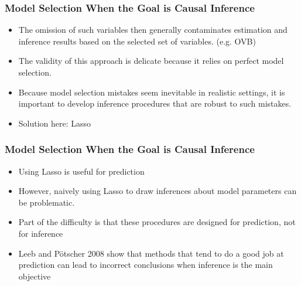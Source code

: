\documentclass[
  shownotes,
  xcolor={svgnames},
  hyperref={colorlinks,citecolor=DarkBlue,linkcolor=DarkRed,urlcolor=DarkBlue}
  , aspectratio=169]{beamer}
\begin{document}
\begin{frame}[fragile]
\frametitle{Model Selection When the Goal is Causal Inference}


\begin{itemize}
  \item The omission of such variables then generally contaminates estimation and inference results based on the selected set of variables. (e.g. OVB)
  \medskip
  \item The validity of this approach is delicate because it relies on perfect model selection.
  \medskip
  \item Because model selection mistakes seem inevitable in realistic settings, it is important to develop inference procedures that are robust to such mistakes.
  \medskip
  \item Solution here: Lasso
\end{itemize}


\end{frame}
\begin{frame}[fragile]
\frametitle{Model Selection When the Goal is Causal Inference}
\begin{itemize}
\item Using Lasso is useful for prediction
\medskip
\item However, naively using Lasso  to draw inferences about model parameters can be problematic.
\medskip
\item Part of the difficulty is that these procedures are designed for prediction, not for inference  
\medskip
\item Leeb and Pötscher 2008 show that methods that tend to do a good job at prediction can lead to incorrect conclusions when inference is the main objective
\end{itemize}
\end{frame}
\end{document}
